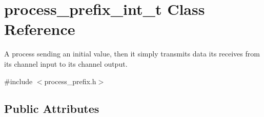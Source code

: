 \hypertarget{structprocess__prefix__int__t}{}\section{process\+\_\+prefix\+\_\+int\+\_\+t Class Reference}
\label{structprocess__prefix__int__t}


A process sending an initial value, then it simply transmits data its receives from its channel input to its channel output.  




{\ttfamily \#include $<$process\+\_\+prefix.\+h$>$}

\subsection*{Public Attributes}
